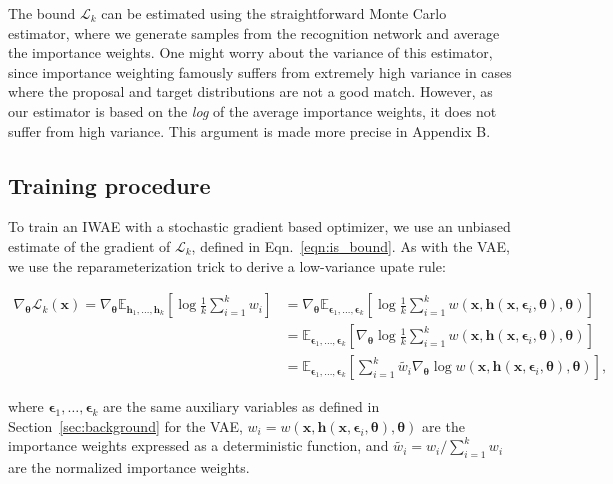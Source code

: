 \documentclass{article} %
\newcommand{\expect}{\mathbb{E}}
\newcommand{\hid}{\mathbf{h}}
\newcommand{\hidS}[1]{\hid_{#1}}
\newcommand{\params}{{\boldsymbol{\theta}}}
\newcommand{\obs}{\mathbf{x}}
\newcommand{\numSamples}{k}
\newcommand{\sampleIdx}{i}
\newcommand{\aux}{\boldsymbol{\epsilon}}
\newcommand{\auxS}[1]{\aux_{#1}}
\newcommand{\isWeight}{w}
\newcommand{\isWeightS}[1]{\isWeight_{#1}}
\newcommand{\isBoundK}[1]{\mathcal{L}_{#1}}
\newcommand{\isWeightNormS}[1]{\widetilde{w_{#1}}}
\begin{document}
The bound $\isBoundK{\numSamples}$ can be estimated using the straightforward Monte Carlo estimator, where we generate samples from the recognition network and average the importance weights. One might worry about the variance of this estimator, since importance weighting famously suffers from extremely high variance in cases where the proposal and target distributions are not a good match. However, as our estimator is based on the \emph{log} of the average importance weights, it does not suffer from high variance. This argument is made more precise in Appendix B.


\subsection{Training procedure}

To train an IWAE with a stochastic gradient based optimizer, we use an unbiased estimate of the gradient of $\isBoundK{\numSamples}$, defined in Eqn.~\ref{eqn:is_bound}. As with the VAE, we use the reparameterization trick to derive a low-variance upate rule:
\begin{small}
\begin{align}
\nabla_\params \isBoundK{\numSamples}(\obs) = \nabla_\params \expect_{\hidS{1},\ldots,\hidS{\numSamples}} \left[ \log \frac{1}{\numSamples} \sum_{\sampleIdx=1}^\numSamples \isWeightS{\sampleIdx} \right] 
&= \nabla_\params \expect_{\auxS{1},\ldots,\auxS{\numSamples}} \left[ \log \frac{1}{\numSamples} \sum_{\sampleIdx=1}^\numSamples \isWeight(\obs, \hid(\obs, \auxS{\sampleIdx}, \params), \params) \right] \\
&= \expect_{\auxS{1},\ldots,\auxS{\numSamples}} \left[ \nabla_\params \log \frac{1}{\numSamples} \sum_{\sampleIdx=1}^\numSamples \isWeight(\obs, \hid(\obs, \auxS{\sampleIdx}, \params), \params) \right] \\
&= \expect_{\auxS{1},\ldots,\auxS{\numSamples}} \left[ \sum_{\sampleIdx=1}^\numSamples \isWeightNormS{\sampleIdx} \nabla_\params \log \isWeight(\obs, \hid(\obs, \auxS{\sampleIdx}, \params), \params) \right], \label{eqn:iwae_gradient}
\end{align}
\end{small}

\noindent where $\auxS{1},\ldots,\auxS{\numSamples}$ are the same auxiliary variables as defined in Section~\ref{sec:background} for the VAE, $\isWeightS{\sampleIdx}=\isWeight(\obs,\hid(\obs, \auxS{\sampleIdx}, \params),\params)$ are the importance weights expressed as a deterministic function, and $\isWeightNormS{\sampleIdx} = \isWeightS{\sampleIdx}/\sum_{\sampleIdx=1}^\numSamples \isWeightS{\sampleIdx}$ are the normalized importance weights.
\end{document}
